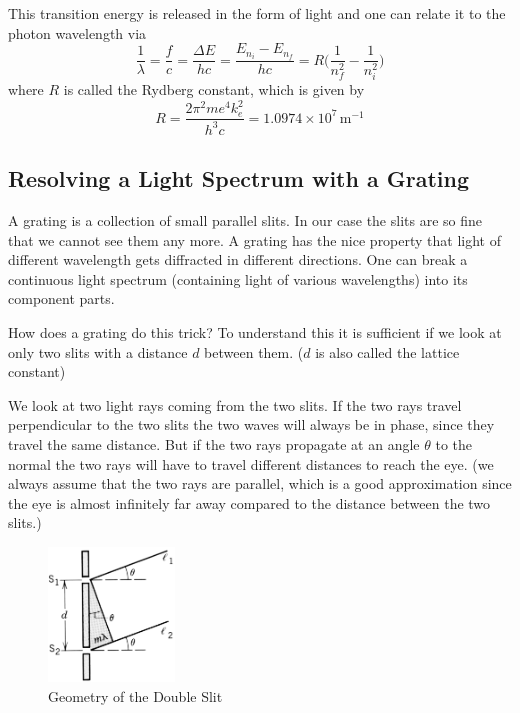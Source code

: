 This transition energy is released in the form of light and one can relate it to the photon wavelength via
\begin{equation}
  \frac{1}{\lambda}=\frac{f}{c}=\frac{\Delta E}{hc}=\frac{E_{n_{i}}-E_{n_{f}}}{hc}=R\bigg(\frac{1}{n^2_{f}}-\frac{1}{n^2_{i}}\bigg)
\label{eq:lambda}
\end{equation}
where $R$ is called the Rydberg constant, which is given by
\begin{equation}
  R=\frac{2\pi^2me^4k^2_{e}}{h^3c}=1.0974\times 10^{7}\, \mathrm{m}^{-1}
\end{equation}

\subsection{Resolving a Light Spectrum with a Grating}
A grating is a collection of small parallel slits. In our case the slits are so fine that we cannot see them any more. A grating has the nice property that light of different wavelength gets diffracted in different directions. One can break a continuous light spectrum (containing light of various wavelengths) into its component parts. \myskip

How does a grating do this trick? To understand this it is sufficient if we look at only two slits with a distance $d$ between them. ($d$ is also called the lattice constant)\myskip

We look at two light rays coming from the two slits. If the two rays travel perpendicular to the two slits the two waves will always be in phase, since they travel the same distance. But if the two rays propagate at an angle $\theta$ to the normal the two rays will have to travel different distances to reach the eye. (we always assume that the two rays are parallel, which is a good approximation since the eye is almost infinitely far away compared to the distance between the two slits.)
\begin{figure}[h]
\centering
\includegraphics[width=0.3\textwidth]{./Exp9/pic/image1.png}
\caption{Geometry of the Double Slit}
\label{fig:slit}
\end{figure}

